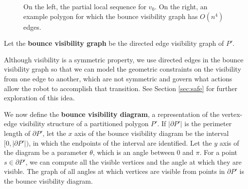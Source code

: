\documentclass[]{styles/svproc}  %
\begin{document}
\begin{figure}[h]
\begin{subfigure}{0.4\textwidth}
\end{subfigure}
\centering
\caption{On the left, the partial local sequence for $v_0$. On the right, an example polygon for which the bounce visibility graph has
$O(n^4)$ edges.\label{fig:alg1}}
\end{figure}

\begin{definition}
Let the \textbf{bounce visibility graph} be the directed edge visibility graph of
$P'$.
\end{definition}

Although visibility is a symmetric property, we use directed edges in the
bounce visibility graph so that 
we can model the 
geometric constraints on the visibility from one edge to another, which are
not symmetric and govern what actions allow the robot to accomplish that
transition. See Section \ref{sec:safe} for further exploration of this idea.

We now define the \textbf{bounce visibility diagram}, a
representation of the vertex-edge visibility structure of a partitioned polygon $P'$.
If $|\partial P'|$ is the perimeter length of $\partial P'$, let the $x$ axis of the
bounce visibility diagram be the interval $[0, |\partial P'|)$, in which the
endpoints of the interval are identified. Let the $y$ axis of the diagram be a
parameter $\theta$, which is an angle between $0$ and $\pi$.
For a point $s \in \partial P'$, we can compute all the visible vertices and
the angle at which they are visible. The graph of all angles at which vertices
are visible from points in $\partial P'$ is the bounce visibility diagram.
\end{document}
